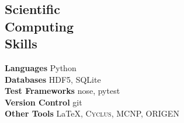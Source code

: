 \documentclass[margin,line]{resume}
\newcommand{\Cyclus}{\textsc{Cyclus}\xspace}%
\begin{document}
\begin{resume}
    \section{\mysidestyle Scientific\\Computing\\Skills}
        \textbf{Languages} \hfill Python\vspace{.5mm}\\%
        \textbf{Databases} \hfill HDF5, SQLite\vspace{.5mm}\\%
        \textbf{Test Frameworks} \hfill nose, pytest\vspace{.5mm}\\%
        \textbf{Version Control} \hfill git\vspace{.5mm}\\%
        \textbf{Other Tools} \hfill \LaTeX, \Cyclus, MCNP, ORIGEN\vspace{.5mm}%

\end{resume}
\end{document}
